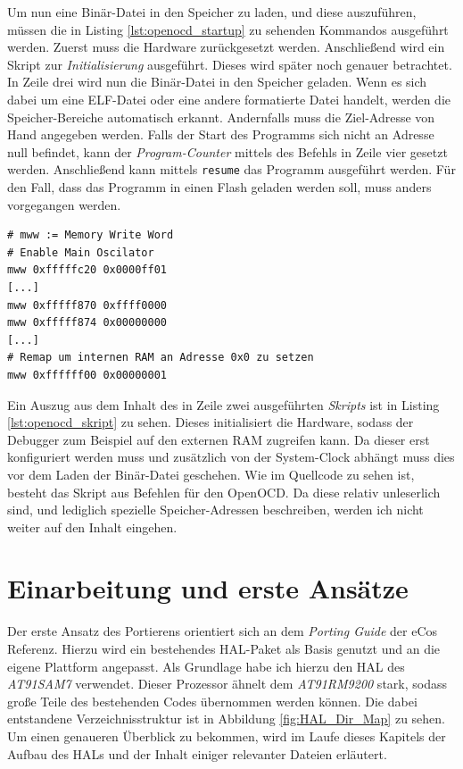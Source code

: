 \documentclass[
  a4paper,					%
  twoside,
  DIV=calc,     				%
  bibliography=totoc,
  cleardoublepage=empty,
  ngerman,     					%
  final       					%
]{scrbook}
\begin{document}
Um nun eine Binär-Datei in den Speicher zu laden, und diese auszuführen, müssen die in Listing \ref{lst:openocd_startup} zu sehenden Kommandos ausgeführt werden. Zuerst muss die Hardware zurückgesetzt werden. Anschließend wird ein Skript zur \emph{Initialisierung} ausgeführt. Dieses wird später noch genauer betrachtet. In Zeile drei wird nun die Binär-Datei in den Speicher geladen. Wenn es sich dabei um eine ELF-Datei oder eine andere formatierte Datei handelt, werden die Speicher-Bereiche automatisch erkannt. Andernfalls muss die Ziel-Adresse von Hand angegeben werden. Falls der Start des Programms sich nicht an Adresse null befindet, kann der \emph{Program-Counter} mittels des Befehls in Zeile vier gesetzt werden. Anschließend kann mittels \texttt{resume} das Programm ausgeführt werden. Für den Fall, dass das Programm in einen Flash geladen werden soll, muss anders vorgegangen werden.

\begin{lstlisting}[frame=single, float, caption={OpenOCD Skript zum Initialisieren der Hardware}, label={lst:openocd_skript}]
# mww := Memory Write Word
# Enable Main Oscilator 
mww 0xfffffc20 0x0000ff01
[...]
mww 0xfffff870 0xffff0000
mww 0xfffff874 0x00000000
[...]
# Remap um internen RAM an Adresse 0x0 zu setzen
mww 0xffffff00 0x00000001
\end{lstlisting}

Ein Auszug aus dem Inhalt des in Zeile zwei ausgeführten \emph{Skripts} ist in Listing \ref{lst:openocd_skript} zu sehen. Dieses initialisiert die Hardware, sodass der Debugger zum Beispiel auf den externen RAM zugreifen kann. Da dieser erst konfiguriert werden muss und zusätzlich von der System-Clock abhängt muss dies vor dem Laden der Binär-Datei geschehen. Wie im Quellcode zu sehen ist, besteht das Skript aus Befehlen für den OpenOCD. Da diese relativ unleserlich sind, und lediglich spezielle Speicher-Adressen beschreiben, werden ich nicht weiter auf den Inhalt eingehen.



\section{Einarbeitung und erste Ansätze}
\label{sec:Einarbeitung}
Der erste Ansatz des Portierens orientiert sich an dem \emph{Porting Guide} der eCos Referenz\cite{ecos_ref}. Hierzu wird ein bestehendes HAL-Paket als Basis genutzt und an die eigene Plattform angepasst. Als Grundlage habe ich hierzu den HAL des \emph{AT91SAM7} verwendet. Dieser Prozessor ähnelt dem \emph{AT91RM9200} stark, sodass große Teile des bestehenden Codes übernommen werden können. Die dabei entstandene Verzeichnisstruktur ist in Abbildung \ref{fig:HAL_Dir_Map} zu sehen. Um einen genaueren Überblick zu bekommen, wird im Laufe dieses Kapitels der Aufbau des HALs und der Inhalt einiger relevanter Dateien erläutert.
\end{document}
